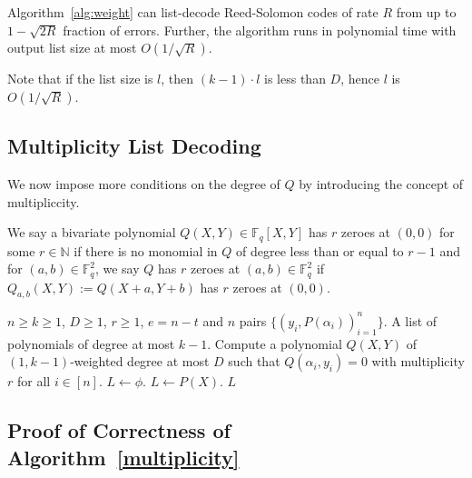  \begin{theorem}
 	\label{th:weight}
	Algorithm~\ref{alg:weight} can list-decode Reed-Solomon codes of rate $R$ from up to $1 - \sqrt{2R}$ fraction of errors. Further, the algorithm runs in polynomial time with output list size at most $O(1/\sqrt{R})$.
 \end{theorem}	
 
  Note that if the list size is $l$, then $(k-1)\cdot l$ is less than $D$, hence $l$ is $O(1/\sqrt{R})$.
 
 \subsection*{Multiplicity List Decoding}
 
 We now impose more conditions on the degree of $Q$ by introducing the concept of multipliccity.
 
 \begin{definition}[]
 	We say a bivariate polynomial $Q(X,Y)\in\mathbb{F}_q[X,Y]$ has $r$ zeroes at $(0,0)$ for some $r\in\mathbb{N}$ if there is no monomial in $Q$ of degree less than or equal to $r-1$ and for $(a,b)\in\mathbb{F}_q^2$, we say $Q$ has $r$ zeroes at $(a,b)\in\mathbb{F}_q^2$ if $Q_{a,b}(X,Y) := Q(X+a ,Y+b)$ has $r$ zeroes at $(0,0)$.
 \end{definition}
 
 \begin{algorithm}\label{multiplicity}
 	\large
 	\caption{\large Multiplicity List-Decoding Algorithm for Reed-Solomon Codes}
 	\begin{algorithmic}[1]
 		\large
 		\Input $n\geq k\geq 1$, $D\geq1$, $r\ge1$, $e = n - t$ and $n$ pairs $\{(y_i, P(\alpha_i))_{i=1}^n\}$.
 		\Output A list of polynomials of degree at most $k-1$.
 		\State Compute a polynomial $Q(X,Y)$ of $(1,k-1)$-weighted degree at most $D$ such that $Q(\alpha_i,y_i) = 0$ with multiplicity $r$ for all $i\in[n]$.
 		\State $L\leftarrow\phi$.
 		\State $L\leftarrow P(X)$.
 		\EndIf
 		\EndFor
 		\State \Return $L$
 	\end{algorithmic}
 \end{algorithm}
 
\subsection*{Proof of Correctness of Algorithm~\ref{multiplicity}}

